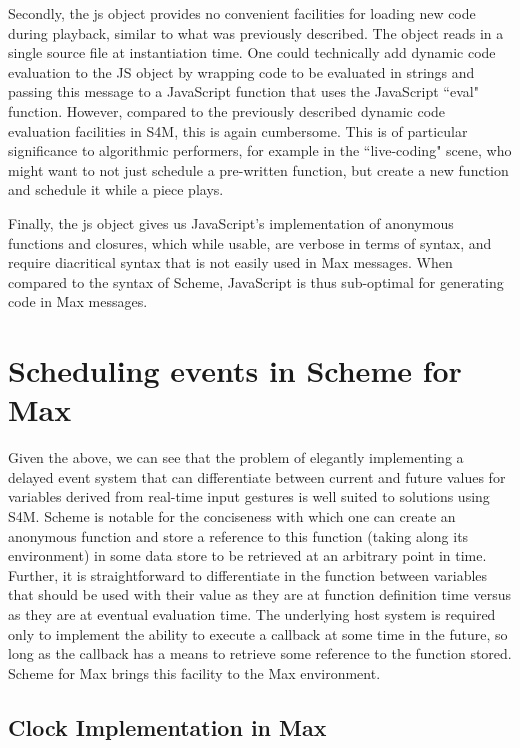 \documentclass[acmsmall]{acmart}
\begin{document}
Secondly, the js object provides no convenient facilities for loading new code
during playback, similar to what was previously described. 
The object reads in a single source file at instantiation time.
One could technically add dynamic code evaluation to the JS object by wrapping
code to be evaluated in strings and passing this message to a JavaScript function
that uses the JavaScript ``eval" function. However, compared to the previously 
described dynamic code evaluation facilities in S4M, this is again cumbersome. 
This is of particular significance to algorithmic performers, 
for example in the ``live-coding" scene, who might
want to not just schedule a pre-written function, but create a new function 
and schedule it while a piece plays.

Finally, the js object gives us JavaScript's implementation of anonymous functions
and closures, which while usable, are verbose in terms of syntax, and require
diacritical syntax that is not easily used in Max messages. When compared to the syntax
of Scheme, JavaScript is thus sub-optimal for generating code in Max messages.


\section{Scheduling events in Scheme for Max}

Given the above, we can see that the problem of elegantly implementing 
a delayed event system that can differentiate between current and future values
for variables derived from real-time input gestures is well suited to solutions 
using S4M. Scheme is notable for the conciseness with which one can create an anonymous function
and store a reference to this function (taking along its environment) in some data
store to be retrieved at an arbitrary point in time. Further, it is straightforward
to differentiate in the function between variables that should
be used with their value as they are at function definition time versus
as they are at eventual evaluation time. The underlying host system is required only to 
implement the ability to execute a callback at some time in the future, so long as 
the callback has a means to retrieve some reference to the function stored.
Scheme for Max brings this facility to the Max environment.


\subsection{Clock Implementation in Max}
\end{document}
